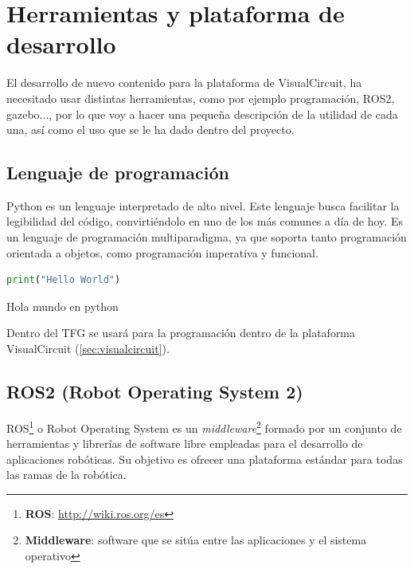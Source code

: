 \chapter{Herramientas y plataforma de desarrollo}
\label{cap:capitulo3}

El desarrollo de nuevo contenido para la plataforma de VisualCircuit, ha necesitado usar distintas herramientas, como por ejemplo programación, ROS2, gazebo..., por lo que voy a hacer una pequeña descripción de la utilidad de cada una, así como el uso que se le ha dado dentro del proyecto.

\section{Lenguaje de programación}
\label{sec:lenguaje_programación}

Python es un lenguaje interpretado de alto nivel. Este lenguaje busca facilitar la legibilidad del código, convirtiéndolo en uno de los más comunes a día de hoy. Es un lenguaje de programación multiparadigma, ya que soporta tanto programación orientada a objetos, como programación imperativa y funcional.\\

\begin{code}[H]
    \begin{lstlisting}[language=python]
    print("Hello World")
    \end{lstlisting}
    \caption[Hola mundo en python]{Hola mundo en python}
    \label{cod:holamundo_python}
\end{code}

Dentro del TFG se usará para la programación dentro de la plataforma VisualCircuit (\ref{sec:visualcircuit}).

\section{ROS2 (Robot Operating System 2)}
\label{sec:ros2}

ROS\footnote{\textbf{ROS}: \url{http://wiki.ros.org/es}} o Robot Operating System es un \textit{middleware}\footnote{{\textbf{Middleware}: software que se sitúa entre las aplicaciones y el sistema operativo}} formado por un conjunto de herramientas y librerías de software libre empleadas para el desarrollo de aplicaciones robóticas. Su objetivo es ofrecer una plataforma estándar para todas las ramas de la robótica.\\

